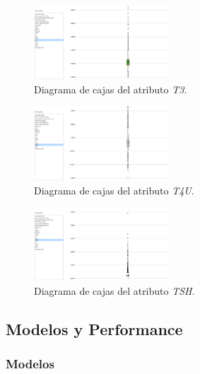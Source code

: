 \documentclass[osajnl,twocolumn,showpacs,superscriptaddress,10pt,floatfix]{revtex4-1} %
\begin{document}
\begin{figure}[H]
    \centering
    \includegraphics[width=0.45\textwidth]{analysis/box_plot_T3}
    \caption{Diagrama de cajas del atributo \textit{T3}.}
    \label{figure:box_plot_T3}
\end{figure}

\begin{figure}[H]
    \centering
    \includegraphics[width=0.45\textwidth]{analysis/box_plot_T4U}
    \caption{Diagrama de cajas del atributo \textit{T4U}.}
    \label{figure:box_plot_T4U}
\end{figure}

\begin{figure}[H]
    \centering
    \includegraphics[width=0.45\textwidth]{analysis/box_plot_TSH}
    \caption{Diagrama de cajas del atributo \textit{TSH}.}
    \label{figure:box_plot_TSH}
\end{figure}

\onecolumngrid

\clearpage

\subsection{Modelos y Performance}

\subsubsection{Modelos} \label{apendix:models:models} 
\end{document}
